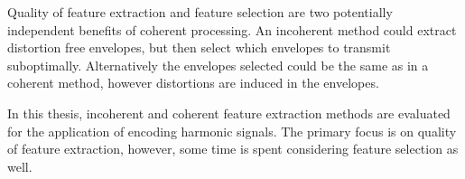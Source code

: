 \documentclass [11pt, proquest,oneside] {ganter_thesis}[2015/03/03]
\begin{document}
Quality of feature extraction and feature selection are two potentially independent benefits of coherent processing.  An incoherent method could extract distortion free envelopes, but then select which envelopes to transmit suboptimally.  Alternatively the envelopes selected could be the same as in a coherent method, however distortions are induced in the envelopes.

In this thesis, incoherent and coherent feature extraction methods are evaluated for the application of encoding harmonic signals.  The primary focus is on quality of feature extraction, however, some time is spent considering feature selection as well.










\end{document}
